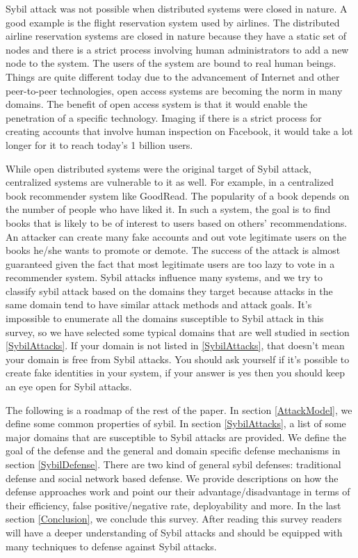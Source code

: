 \documentclass[conference]{IEEEtran}
\begin{document}
Sybil attack was not possible when distributed systems were closed in nature. A good example is the flight reservation system used by airlines.
The distributed airline reservation systems are closed in nature because they have a static set of nodes and there is a strict process involving human 
administrators to add a new node to the system. The users of the system are bound to real human beings. Things are quite different today due to the 
advancement of Internet and other peer-to-peer technologies, open access systems are becoming the norm in many domains. The benefit of open access
system is that it would enable the penetration of a specific technology. Imaging if there is a strict process for creating accounts that involve human inspection on Facebook, it would take a lot longer for it to reach today's 1 billion users. 

While open distributed systems were the original target of Sybil attack, centralized systems are vulnerable to it as well.
For example, in a centralized book recommender system like GoodRead.
The popularity of a book depends on the number of people who have liked it. In such a system, the goal is to find books that is likely to be of interest to users based on others'
recommendations. An attacker can create many fake accounts and out vote legitimate users on the books he/she wants to promote or demote. The success of the attack is almost guaranteed given
the fact that most legitimate users are too lazy to vote in a recommender system. 
Sybil attacks influence many systems, and we try to classify sybil attack based on the domains they target because attacks in the same domain tend to
have similar attack methods and attack goals.
It's impossible to enumerate all the domains susceptible to Sybil attack in 
this survey, so we have selected some typical domains that are well studied in section \ref{SybilAttacks}. If your domain is not listed in \ref{SybilAttacks}, 
that doesn't mean your domain is free from Sybil attacks. You should ask yourself if it's possible to create fake identities in your system, if your answer is yes then you should keep an eye open for Sybil attacks.

The following is a roadmap of the rest of the paper.
In section \ref{AttackModel}, we define some common properties of sybil. In section \ref{SybilAttacks}, a list of some major domains that are susceptible to Sybil attacks are provided.
We define the goal of the defense and the general and domain specific defense mechanisms in section \ref{SybilDefense}. 
There are two kind of general sybil defenses: traditional defense and social
network based defense. We provide descriptions on how the defense approaches work and point our their advantage/disadvantage
in terms of their efficiency, false positive/negative rate, deployability and more. In the last section \ref{Conclusion}, we conclude this survey.
After reading this survey readers will have a deeper understanding of Sybil attacks and should be equipped with many techniques to defense against Sybil attacks.
\end{document}
